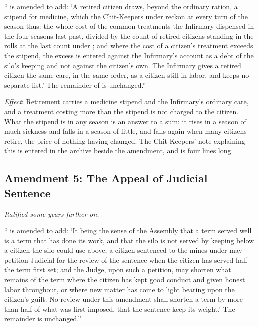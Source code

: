 `` is amended to add: `A retired citizen draws, beyond the ordinary ration, a stipend for medicine, which the Chit-Keepers under  reckon at every turn of the season thus: the whole cost of the common treatments the Infirmary dispensed in the four seasons last past, divided by the count of retired citizens standing in the rolls at the last count under ; and where the cost of a citizen's treatment exceeds the stipend, the excess is entered against the Infirmary's account as a debt of the silo's keeping and not against the citizen's own. The Infirmary gives a retired citizen the same care, in the same order, as a citizen still in labor, and keeps no separate list.' The remainder of  is unchanged.''

\textit{Effect}: Retirement carries a medicine stipend and the Infirmary's ordinary care, and a treatment costing more than the stipend is not charged to the citizen. What the stipend is in any season is an answer to a sum: it rises in a season of much sickness and falls in a season of little, and falls again when many citizens retire, the price of nothing having changed. The Chit-Keepers' note explaining this is entered in the archive beside the amendment, and is four lines long.

\subsection*{Amendment 5: The Appeal of Judicial Sentence}

\textit{Ratified some years further on.}

`` is amended to add: `It being the sense of the Assembly that a term served well is a term that has done its work, and that the silo is not served by keeping below a citizen the silo could use above, a citizen sentenced to the mines under  may petition Judicial for the review of the sentence when the citizen has served half the term first set; and the Judge, upon such a petition, may shorten what remains of the term where the citizen has kept good conduct and given honest labor throughout, or where new matter has come to light bearing upon the citizen's guilt. No review under this amendment shall shorten a term by more than half of what was first imposed, that the sentence keep its weight.' The remainder is unchanged.''

